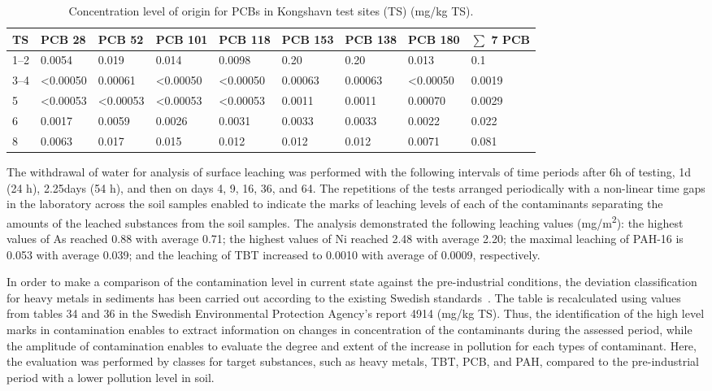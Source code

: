 \documentclass[algorithms,article,accept,pdftex,moreauthors]{Definitions/mdpi}
\begin{document}
\vspace{-2pt}
\begin{table}[H] 
\caption{Concentration level of origin for PCBs in Kongshavn test sites (TS) (mg/kg TS).\label{tab04}}
\tablesize{\footnotesize}
\begin{tabularx}{\linewidth}{p{0.5cm}p{1.27cm}p{1.27cm}p{1.27cm}p{1.27cm}p{1.17cm}p{1.17cm}p{1.27cm}p{1.3cm}}
\toprule
\textbf{TS} & \textbf{PCB 28} & \textbf{PCB 52} & \textbf{PCB 101} & \textbf{PCB 118} & \textbf{PCB 153} & \textbf{PCB 138} & \textbf{PCB 180} & \textbf{$\sum$ 7 PCB}\\
\midrule
1--2 & 0{.}0054   & 0{.}019     & 0{.}014 	     & 0{.}0098  & 0{.}20     & 0{.}20       & 0{.}013     & 0{.}1 \\
3--4 & <0{.}00050 & 0{.}00061 & <0{.}00050    & <0{.}00050 & 0{.}00063 & 0{.}00063 & <0{.}00050 & 0{.}0019 \\
5 & <0{.}00053 & <0{.}00053  & <0{.}00053  & <0{.}00053 & 0{.}0011   & 0{.}0011     & 0{.}00070     & 0{.}0029 \\
6 & 0{.}0017   & 0{.}0059 	& 0{.}0026       & 0{.}0031  & 0{.}0033  & 0{.}0033      & 0{.}0022      & 0{.}022 \\
8 & 0{.}0063   & 0{.}017 	& 0{.}015         & 0{.}012     & 0{.}012    & 0{.}012      & 0{.}0071      & 0{.}081\\
\bottomrule
\end{tabularx}
\end{table}

The withdrawal of water for analysis of surface leaching was performed with the following intervals of time periods after 6h of testing, 1d (24 h), 2{.}25days (54 h), and then on days 4, 9, 16, 36, and 64. The repetitions of the tests arranged periodically with a non-linear time gaps in the laboratory across the soil samples {enabled} to indicate {the }marks of leaching levels of {each of the }contaminants separating the amounts of the leached substances from the soil samples. The analysis demonstrated the following leaching values (mg/m\textsuperscript{2}): the highest values of As reached 0.88 with average 0.71; the highest values of Ni reached 2.48 with average 2.20; the maximal leaching of PAH-16 is 0.053 with average 0.039; {and }the leaching of TBT increased to 0.0010 with average of 0.0009{, respectively}. 

In order to make a comparison of the contamination level in current state against the pre-industrial conditions, the deviation classification for heavy metals in sediments has been carried out according to the existing Swedish standards~\cite{ZefferSamuelsson}. The table is recalculated using values from tables 34 and 36 in the Swedish Environmental Protection Agency's report 4914 (mg/kg TS). Thus, the identification of the high level marks in contamination enables to extract information on changes in {concentration of the contaminants }during the {assessed} period, while the amplitude of contamination enables to evaluate the {degree and extent} of {the }increase {in pollution }for each types of contaminant{. Here, the evaluation was performed by classes for target substances, such as }heavy metals, TBT, PCB, and PAH, compared to the pre-industrial period with {a lower} pollution level in soil. 
\end{document}
